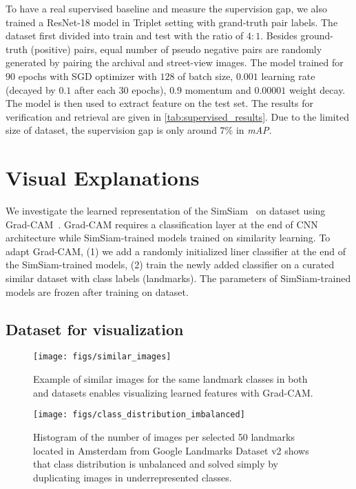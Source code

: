 \documentclass[a4paper,conference]{IEEEtran}
\begin{document}
To have a real supervised baseline and measure the supervision gap, we also trained a ResNet-18 model in Triplet setting \cite{balntas2016learning} with grand-truth pair labels. The dataset first divided into train and test with the ratio of $4:1$. Besides ground-truth (positive) pairs, equal number of pseudo negative pairs are randomly generated by pairing the archival and street-view images. The model trained for $90$ epochs with SGD optimizer with $128$ of batch size, $0.001$ learning rate (decayed by $0.1$ after each $30$ epochs), $0.9$ momentum and $0.00001$ weight decay. The model is then used to extract feature on the test set. The results for verification and retrieval are given in \cref{tab:supervised_results}. Due to the limited size of \amstertime dataset, the supervision gap is only around $7\%$ in {\textit{mAP}}. 



 \section{Visual Explanations}
\label{sec:visualization}
We investigate the learned representation of the SimSiam~\cite{chen2020simsiam} on \amstertime dataset using   Grad-CAM~\cite{selvaraju2017grad}. 
Grad-CAM requires a classification layer at the end of CNN architecture while SimSiam-trained models trained on similarity learning. To adapt Grad-CAM, (1) we add a randomly initialized liner classifier at the end of the SimSiam-trained models, (2) train the newly added classifier on a curated similar dataset with class labels (landmarks). The parameters of SimSiam-trained models are frozen after training on \amstertime dataset. 

\subsection{Dataset for visualization}

\begin{figure}[t]
\centering
\texttt{[image: figs/similar\_images]}
\caption{Example of similar images for the same landmark classes in both \amstertime and \amsterdam datasets enables visualizing learned features with Grad-CAM.}
\label{fig:similar_images}
\end{figure}

\begin{figure}[t]
\centering
\texttt{[image: figs/class\_distribution\_imbalanced]}
\caption{Histogram of the number of images per selected 50 landmarks located in Amsterdam from Google Landmarks Dataset v2 shows that class distribution is unbalanced and solved simply by duplicating images in underrepresented classes.}
\label{fig:class_distribution}
\end{figure}
\end{document}
